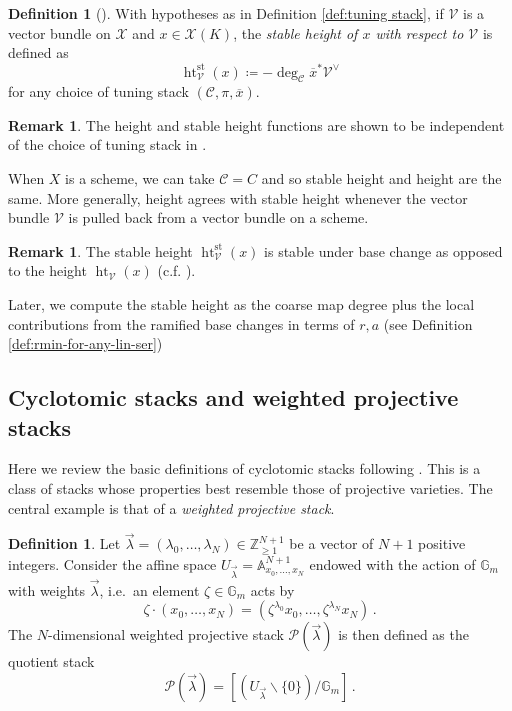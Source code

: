 \documentclass[a4paper,12pt]{amsart}
\theoremstyle{definition}
\newtheorem{defn}[thm]{Definition}
\newtheorem{rmk}[thm]{Remark}
\newcommand{\cX}{\mathcal{X}}
\newcommand{\cC}{\mathcal{C}}
\DeclareMathOperator{\height}{ht}
\newcommand{\Pcv}{\mathcal{P}(\vec{\lambda})}
\newcommand{\lambdavec}{{\vec{\lambda}}}
\newcommand{\Ab}{\mathbb{A}}
\newcommand{\Gb}{\mathbb{G}}
\renewcommand{\setminus}{\smallsetminus}
\begin{document}
	
	
	\begin{defn}[{\cite[Def. 2.12]{ESZB}}]
		\label{def:stacky-st-ht}
		With hypotheses as in Definition \ref{def:tuning stack}, if $\mathcal{V}$ is a vector bundle on $\cX$ and $x\in\cX(K)$, the \emph{stable height of $x$ with respect to $\mathcal{V}$} is defined as
		\[
		\height^{\mathrm{st}}_{\mathcal{V}}(x) \coloneqq -\deg_{\cC}\overline{x}^*\mathcal{V}^\vee
		\]
		for any choice of tuning stack $(\cC,\pi,\overline{x})$.
	\end{defn}
	
	\begin{rmk}
		The height and stable height functions are shown to be independent of the choice of tuning stack in \cite[Prop. 2.13]{ESZB}.
	\end{rmk}
	
	When $X$ is a scheme, we can take $\cC = C$ and so stable height and height are the same. More generally, height agrees with stable height whenever the vector bundle $\mathcal{V}$ is pulled back from a vector bundle on a scheme. 
	
	\begin{rmk}
		The stable height $\height^{\mathrm{st}}_{\mathcal{V}}(x)$ is stable under base change as opposed to the height $\height_{\mathcal{V}}(x)$ (c.f. \cite[Prop. 2.14]{ESZB}).
	\end{rmk}
	
	Later, we compute the stable height as the coarse map degree plus the local contributions from the ramified base changes in terms of $r,a$ (see Definition \ref{def:rmin-for-any-lin-ser})
	
	
	
	
	
	\subsection{Cyclotomic stacks and weighted projective stacks}\label{sec:cyclotomic} 
	
	Here we review the basic definitions of cyclotomic stacks following \cite[Sec. 2]{AH}. This is a class of stacks whose properties best resemble those of projective varieties. The central example is that of a \emph{weighted projective stack}. 
	
	\begin{defn}\label{def:wtproj} 
		Let $\lambdavec = (\lambda_0, \ldots, \lambda_N) \in \mathbb{Z}_{\geq 1}^{N+1}$ be a vector of $N+1$ positive integers. Consider the affine space $U_\lambdavec = \Ab_{x_0, \dotsc, x_N}^{N+1}$ endowed with the action of $\Gb_m$ with weights $\lambdavec$, i.e.~an element $\zeta \in \Gb_m$ acts by
		\begin{equation}
			\zeta \cdot (x_0, \ldots, x_N) = (\zeta^{\lambda_0} x_0, \ldots, \zeta^{\lambda_N} x_N)\,.
		\end{equation}
		The $N$-dimensional weighted projective stack $\Pcv$ is then defined as the quotient stack
		\[
		\Pcv = \left[(U_{\lambdavec} \setminus \{0\})/\Gb_m \right]\,.
		\]
	\end{defn}
	
\end{document}
